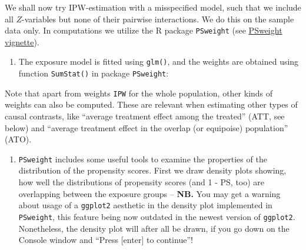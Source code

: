 \documentclass[
]{book}
\newenvironment{Shaded}{\begin{snugshade}}{\end{snugshade}}
\newcommand{\AttributeTok}[1]{\textcolor[rgb]{0.13,0.29,0.53}{#1}}
\newcommand{\ConstantTok}[1]{\textcolor[rgb]{0.56,0.35,0.01}{#1}}
\newcommand{\DecValTok}[1]{\textcolor[rgb]{0.00,0.00,0.81}{#1}}
\newcommand{\FunctionTok}[1]{\textcolor[rgb]{0.13,0.29,0.53}{\textbf{#1}}}
\newcommand{\NormalTok}[1]{#1}
\newcommand{\OtherTok}[1]{\textcolor[rgb]{0.56,0.35,0.01}{#1}}
\newcommand{\SpecialCharTok}[1]{\textcolor[rgb]{0.81,0.36,0.00}{\textbf{#1}}}
\newcommand{\StringTok}[1]{\textcolor[rgb]{0.31,0.60,0.02}{#1}}
\newcounter{none} %
\providecommand{\tightlist}{%
  \setlength{\itemsep}{0pt}\setlength{\parskip}{0pt}}
\begin{document}
We shall now try IPW-estimation with a misspecified model, such that we
include all \(Z\)-variables but none of their pairwise interactions. We do
this on the sample data only. In computations we utilize the R package
\texttt{PSweight}
(see \href{https://cran.rstudio.com/web//packages/PSweight/vignettes/Software_vig.pdf}{PSweight vignette}).

\begin{enumerate}
\def\labelenumi{\arabic{enumi}.}
\tightlist
\item
  The exposure model is fitted using \texttt{glm()}, and the weights are
  obtained using function \texttt{SumStat()} in package \texttt{PSweight}:
\end{enumerate}

\begin{Shaded}
\end{Shaded}

Note that apart from weights \texttt{IPW} for the whole population, other kinds
of weights can also be computed. These are relevant when estimating
other types of causal contrasts, like ``average treatment effect among
the treated'' (ATT, see below) and ``average treatment effect in the
overlap (or equipoise) population'' (ATO).

\begin{enumerate}
\def\labelenumi{\arabic{enumi}.}
\setcounter{enumi}{1}
\tightlist
\item
  \texttt{PSweight} includes some useful tools to examine the properties of
  the distribution of the propensity scores. First we draw density
  plots showing, how well the distributions of propensity scores (and
  1 - PS, too) are overlapping between the exposure groups -- \textbf{NB.}
  You may get a warning about usage of a
  \texttt{ggplot2} aesthetic in the density plot implemented in \texttt{PSweight},
  this feature being now outdated in the newest version of \texttt{ggplot2}.
  Nonetheless, the density plot will after all be drawn, if you go
  down on the Console window and ``Press {[}enter{]} to continue''!
\end{enumerate}
\end{document}
